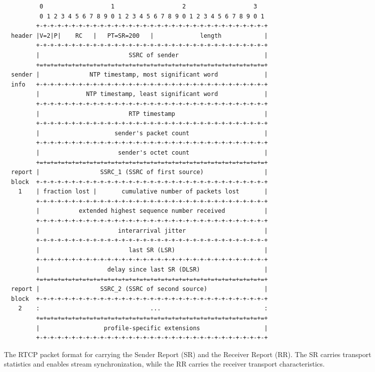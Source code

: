 \begin{figure}[!h]
\begin{spacing}{0.5}
{\footnotesize
\begin{verbatim}
          0                   1                   2                   3
          0 1 2 3 4 5 6 7 8 9 0 1 2 3 4 5 6 7 8 9 0 1 2 3 4 5 6 7 8 9 0 1
         +-+-+-+-+-+-+-+-+-+-+-+-+-+-+-+-+-+-+-+-+-+-+-+-+-+-+-+-+-+-+-+-+
  header |V=2|P|    RC   |   PT=SR=200   |             length            |
         +-+-+-+-+-+-+-+-+-+-+-+-+-+-+-+-+-+-+-+-+-+-+-+-+-+-+-+-+-+-+-+-+
         |                         SSRC of sender                        |
         +=+=+=+=+=+=+=+=+=+=+=+=+=+=+=+=+=+=+=+=+=+=+=+=+=+=+=+=+=+=+=+=+
  sender |              NTP timestamp, most significant word             |
  info   +-+-+-+-+-+-+-+-+-+-+-+-+-+-+-+-+-+-+-+-+-+-+-+-+-+-+-+-+-+-+-+-+
         |             NTP timestamp, least significant word             |
         +-+-+-+-+-+-+-+-+-+-+-+-+-+-+-+-+-+-+-+-+-+-+-+-+-+-+-+-+-+-+-+-+
         |                         RTP timestamp                         |
         +-+-+-+-+-+-+-+-+-+-+-+-+-+-+-+-+-+-+-+-+-+-+-+-+-+-+-+-+-+-+-+-+
         |                     sender's packet count                     |
         +-+-+-+-+-+-+-+-+-+-+-+-+-+-+-+-+-+-+-+-+-+-+-+-+-+-+-+-+-+-+-+-+
         |                      sender's octet count                     |
         +=+=+=+=+=+=+=+=+=+=+=+=+=+=+=+=+=+=+=+=+=+=+=+=+=+=+=+=+=+=+=+=+
  report |                 SSRC_1 (SSRC of first source)                 |
  block  +-+-+-+-+-+-+-+-+-+-+-+-+-+-+-+-+-+-+-+-+-+-+-+-+-+-+-+-+-+-+-+-+
    1    | fraction lost |       cumulative number of packets lost       |
         +-+-+-+-+-+-+-+-+-+-+-+-+-+-+-+-+-+-+-+-+-+-+-+-+-+-+-+-+-+-+-+-+
         |           extended highest sequence number received           |
         +-+-+-+-+-+-+-+-+-+-+-+-+-+-+-+-+-+-+-+-+-+-+-+-+-+-+-+-+-+-+-+-+
         |                      interarrival jitter                      |
         +-+-+-+-+-+-+-+-+-+-+-+-+-+-+-+-+-+-+-+-+-+-+-+-+-+-+-+-+-+-+-+-+
         |                         last SR (LSR)                         |
         +-+-+-+-+-+-+-+-+-+-+-+-+-+-+-+-+-+-+-+-+-+-+-+-+-+-+-+-+-+-+-+-+
         |                   delay since last SR (DLSR)                  |
         +=+=+=+=+=+=+=+=+=+=+=+=+=+=+=+=+=+=+=+=+=+=+=+=+=+=+=+=+=+=+=+=+
  report |                 SSRC_2 (SSRC of second source)                |
  block  +-+-+-+-+-+-+-+-+-+-+-+-+-+-+-+-+-+-+-+-+-+-+-+-+-+-+-+-+-+-+-+-+
    2    :                               ...                             :
         +=+=+=+=+=+=+=+=+=+=+=+=+=+=+=+=+=+=+=+=+=+=+=+=+=+=+=+=+=+=+=+=+
         |                  profile-specific extensions                  |
         +-+-+-+-+-+-+-+-+-+-+-+-+-+-+-+-+-+-+-+-+-+-+-+-+-+-+-+-+-+-+-+-+
\end{verbatim}
}
\end{spacing}
\caption{The RTCP packet format for carrying the Sender Report (SR) and
the Receiver Report (RR). The SR carries transport statistics and enables 
stream synchronization, while the RR carries the receiver transport 
characteristics.}
\label{fig:3:rtcp.hdr}
\end{figure}

